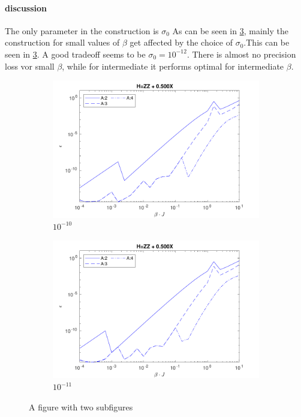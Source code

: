 \paragraph{discussion}

The only parameter in the construction is $\sigma_0$ As can be seen in \cref{fig:sigman0}, mainly the construction for small values of $\beta$ get affected by the choice of $\sigma_0$.This can be seen in \cref{fig:sigman0}. A good tradeoff seems to be $ \sigma_0 = {10}^{-12}$. There is almost no precision loss vor small $\beta$, while for intermediate it performs optimal for intermediate $\beta$.

\begin{figure}
	\centering
	\begin{subfigure}{\textwidth}
		\centering
		\includegraphics[width=0.8\linewidth]{Figuren/mpo_construction/sigm0/e10.pdf}
		\caption{ ${10}^{-10}$}
		\label{fig:sub1}
	\end{subfigure}%

	\begin{subfigure}{\textwidth}
		\centering
		\includegraphics[width=0.8\linewidth]{Figuren/mpo_construction/sigm0/e11.pdf}
		\caption{${10}^{-11}$}
		\label{fig:sub2}
	\end{subfigure}
	\caption{A figure with two subfigures}
	\label{fig:sigman0}
\end{figure}

